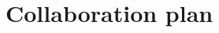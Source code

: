 \documentclass[letterpaper, 11 pt, onecolumn]{article}
\begin{document}


\section{Collaboration plan}

\end{document}

